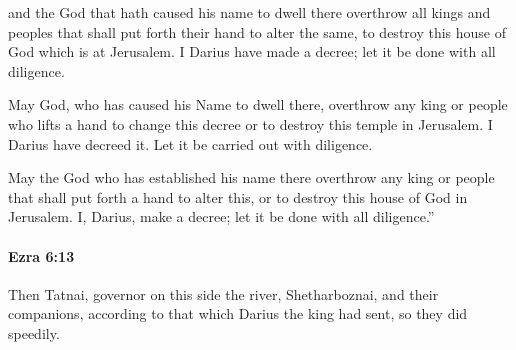			\begin{versebox}
					\item[BHS] 
					\item[LXX] 
					\item[ASV] and the God that hath caused his name to dwell there overthrow all kings and peoples that shall put forth their hand to alter the same, to destroy this house of God which is at Jerusalem. I Darius have made a decree; let it be done with all diligence.
					\item[NIV] May God, who has caused his Name to dwell there, overthrow any king or people who lifts a hand to change this decree or to destroy this temple in Jerusalem. I Darius have decreed it. Let it be carried out with diligence.
					\item[NRSV] May the God who has established his name there overthrow any king or people that shall put forth a hand to alter this, or to destroy this house of God in Jerusalem. I, Darius, make a decree; let it be done with all diligence.”
			\end{versebox}

		\paragraph{Ezra 6:13} %
			\label{EZRA-6-13}

			Then Tatnai, governor on this side the river, Shetharboznai, and their companions, according to that which Darius the king had sent, so they did speedily.

